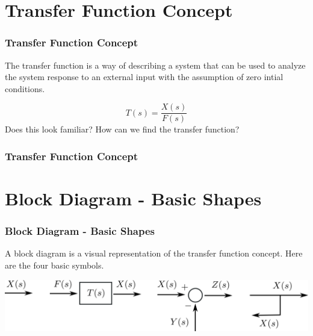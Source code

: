 \documentclass{beamer}                  %
\newcommand{\sectiontitleII}{Transfer Function Concept}
\newcommand{\sectiontitleIII}{Block Diagram - Basic Shapes}
\begin{document}
\section{\sectiontitleII}

	\begin{frame}[label=sectionII,containsverbatim] \small
			\frametitle{\sectiontitleII}

			\vspace{3mm}
		The transfer function is a way of describing a system that can be used to analyze the system response to an external input with the assumption of zero intial conditions.  

			
		\[ T(s)=\frac{X(s)}{F(s)} \]
		\vspace{10mm}
		Does this look familiar? How can we find the transfer function?		

	\end{frame}

	\begin{frame} \small
		\frametitle{\sectiontitleII}
			
	\end{frame}	

\section{\sectiontitleIII}

	\begin{frame}[label=sectionIII] \small
		\frametitle{\sectiontitleIII}

		\vspace{3mm}	
		A block diagram is a visual representation of the transfer function concept. Here are the four basic symbols.

		\vspace{5mm}

		\includegraphics[scale=.04]{four_basic_symbols.png} \vspace{2mm}\\

	

		\btVFill

		\btVFill
	\end{frame}	
	
\end{document}
